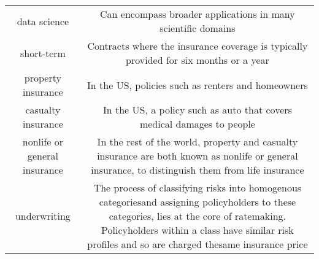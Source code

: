 \documentclass[]{book}
\theoremstyle{definition}
\theoremstyle{definition}
\theoremstyle{definition}
\theoremstyle{remark}
\begin{document}
\begin{longtable}[]{@{}cc@{}}
\begin{minipage}[t]{0.41\columnwidth}
data science\strut
\end{minipage} & \begin{minipage}[t]{0.42\columnwidth}\centering\strut
Can encompass broader applications in many scientific domains\strut
\end{minipage}\tabularnewline
\begin{minipage}[t]{0.41\columnwidth}\centering\strut
short-term\strut
\end{minipage} & \begin{minipage}[t]{0.42\columnwidth}\centering\strut
Contracts where the insurance coverage is typically provided for six
months or a year\strut
\end{minipage}\tabularnewline
\begin{minipage}[t]{0.41\columnwidth}\centering\strut
property insurance\strut
\end{minipage} & \begin{minipage}[t]{0.42\columnwidth}\centering\strut
In the US, policies such as renters and homeowners\strut
\end{minipage}\tabularnewline
\begin{minipage}[t]{0.41\columnwidth}\centering\strut
casualty insurance\strut
\end{minipage} & \begin{minipage}[t]{0.42\columnwidth}\centering\strut
In the US, a policy such as auto that covers medical damages to
people\strut
\end{minipage}\tabularnewline
\begin{minipage}[t]{0.41\columnwidth}\centering\strut
nonlife or general insurance\strut
\end{minipage} & \begin{minipage}[t]{0.42\columnwidth}\centering\strut
In the rest of the world, property and casualty insurance are both known
as nonlife or general insurance, to distinguish them from life
insurance\strut
\end{minipage}\tabularnewline
\begin{minipage}[t]{0.41\columnwidth}\centering\strut
underwriting\strut
\end{minipage} & \begin{minipage}[t]{0.42\columnwidth}\centering\strut
The process of classifying risks into homogenous categoriesand assigning
policyholders to these categories, lies at the core of ratemaking.
Policyholders within a class have similar risk profiles and so are
charged thesame insurance price\strut
\end{minipage}\tabularnewline

\end{longtable}
\end{document}
